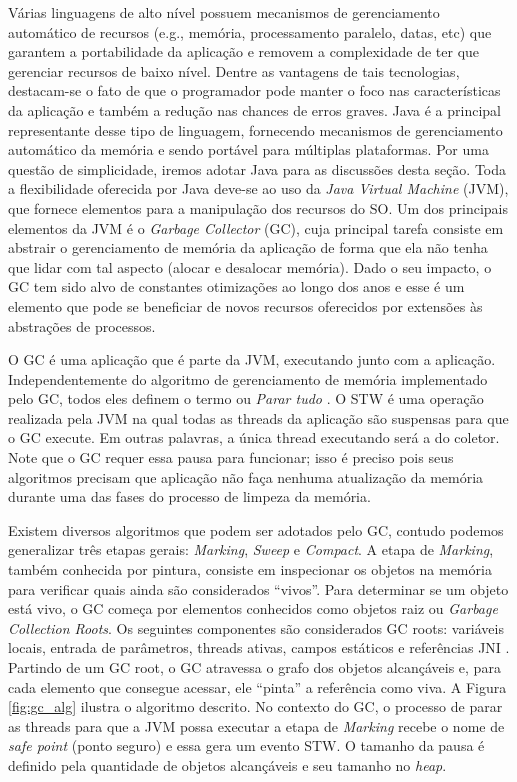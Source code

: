 Várias linguagens de alto nível possuem mecanismos de gerenciamento automático de recursos
(e.g., memória, processamento paralelo, datas, etc) que garantem a portabilidade
da aplicação e removem a complexidade de ter que gerenciar recursos de baixo
nível. Dentre as vantagens de tais tecnologias, destacam-se o fato de que o
programador pode manter o foco nas características da aplicação e também a redução
nas chances de erros graves. Java é a principal representante desse tipo de
linguagem, fornecendo mecanismos de gerenciamento automático da memória e sendo
portável para múltiplas plataformas. Por uma questão de simplicidade, iremos
adotar Java para as discussões desta seção. Toda a flexibilidade
oferecida por Java deve-se ao uso da \textit{Java Virtual Machine} (JVM), que
fornece elementos para a manipulação dos recursos do SO. Um dos principais
elementos da JVM é o \textit{Garbage Collector} (GC), cuja principal tarefa
consiste em abstrair o gerenciamento de memória da aplicação de forma que ela
não tenha que lidar com tal aspecto (alocar e desalocar memória). Dado o seu impacto, o
GC tem sido alvo de constantes otimizações ao longo dos anos e esse é um
elemento que pode se beneficiar de novos recursos oferecidos por extensões às
abstrações de processos.

O GC é uma aplicação que é parte da JVM, executando junto com a aplicação.
Independentemente do algoritmo de gerenciamento de memória implementado pelo
GC, todos eles definem o termo  ou
\textit{Parar tudo} \citep{gc_pauseless}. O STW é uma operação realizada pela
JVM  na qual todas as threads da aplicação são suspensas para que o GC execute.
Em outras palavras, a única thread executando será a do coletor. Note que o GC
requer essa pausa para funcionar; isso é preciso pois seus algoritmos precisam que
aplicação não faça nenhuma atualização da memória durante uma das fases do
processo de limpeza da memória.

Existem diversos algoritmos que podem ser adotados pelo GC, contudo podemos
generalizar três etapas gerais: \textit{Marking}, \textit{Sweep} e
\textit{Compact}. A etapa de \textit{Marking}, também conhecida por pintura,
consiste em inspecionar os objetos na memória para verificar quais ainda são
considerados ``vivos''. Para determinar se um objeto está vivo, o GC começa por
elementos conhecidos como objetos raiz ou \textit{Garbage Collection Roots}. Os
seguintes componentes são considerados GC roots: variáveis locais,
entrada de parâmetros, threads ativas, campos estáticos e referências JNI
\citep{gc_basics}. Partindo de um GC root, o GC atravessa o grafo dos objetos
alcançáveis e, para cada elemento que consegue acessar, ele ``pinta'' a referência
como viva. A Figura \ref{fig:gc_alg} ilustra o algoritmo descrito. No contexto
do GC, o processo de parar as threads para que a JVM possa executar a etapa de
\textit{Marking} recebe o nome de \textit{safe point} (ponto seguro) e essa
gera um evento STW. O tamanho da pausa é definido pela quantidade de objetos
alcançáveis e seu tamanho no \textit{heap}.

